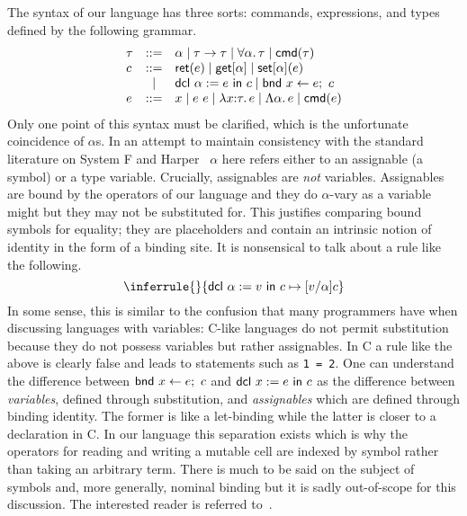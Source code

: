 The syntax of our language has three sorts: commands, expressions, and
types defined by the following grammar.
\[
  \begin{array}{lcl}
    \tau & ::= & \alpha \mid \tau \to \tau \mid \forall \alpha.\, \tau
    \mid \mathsf{cmd}(\tau)\\
    c & ::= & \mathsf{ret}(e) \mid \mathsf{get}[\alpha] \mid \mathsf{set}[\alpha](e) \\
      & \mid & \mathsf{dcl}\ \alpha := e\ \mathsf{in}\ c \mid \mathsf{bnd}\ x \gets e;\ c\\
    e & ::= & x \mid e\ e \mid \lambda x {:} \tau.\, e \mid
              \Lambda \alpha.\, e \mid \mathsf{cmd}(e)
  \end{array}
\]
Only one point of this syntax must be clarified, which is the
unfortunate coincidence of $\alpha$s. In an attempt to maintain
consistency with the standard literature on System F and
Harper~\citep{TODO:PFPL} $\alpha$ here refers either to an assignable
(a symbol) or a type variable. Crucially, assignables are \emph{not}
variables. Assignables are bound by the operators of our language and
they do $\alpha$-vary as a variable might but they may not be
substituted for. This justifies comparing bound symbols for equality;
they are placeholders and contain an intrinsic notion of identity in
the form of a binding site. It is nonsensical to talk about a rule
like the following.
\[
  \inferrule{ }{\step{\dcl{\alpha}{v}{c}}{[v/\alpha]c}}
\]
In some sense, this is similar to the confusion that many programmers
have when discussing languages with variables: C-like languages do not
permit substitution because they do not possess variables but rather
assignables. In C a rule like the above is clearly false and leads to
statements such as \verb+1 = 2+. One can understand the difference
between $\mathsf{bnd}\ x \gets e;\ c$ and $\mathsf{dcl}\ x := e\ \mathsf{in}\ c$ as the difference between
\emph{variables}, defined through substitution, and \emph{assignables}
which are defined through binding identity. The former is like a
let-binding while the latter is closer to a declaration in C. In our
language this separation exists which is why the operators for reading
and writing a mutable cell are indexed by symbol rather than taking an
arbitrary term. There is much to be said on the subject of symbols
and, more generally, nominal binding but it is sadly out-of-scope for
this discussion. The interested reader is referred
to~\citep{TODO-NOMINAL-STUFF}.

